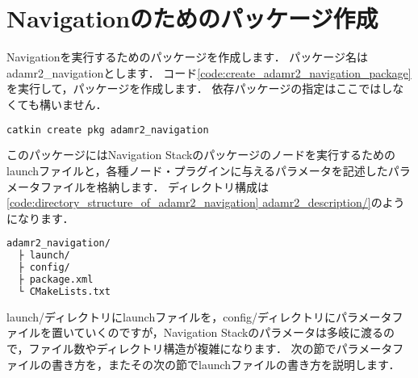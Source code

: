 \documentclass[{../../master}]{subfiles}
\begin{document}
\section{Navigationのためのパッケージ作成}

Navigationを実行するためのパッケージを作成します．
パッケージ名は\textsf{adamr2\_navigation}とします．
コード\ref{code:create_adamr2_navigation_package}を実行して，パッケージを作成します．
依存パッケージの指定はここではしなくても構いません．

\begin{lstlisting}[language=sh, label=code:create_adamr2_navigation_package, caption=Create \textsf{adamr2\_navigation} Package]
catkin create pkg adamr2_navigation
\end{lstlisting}

このパッケージにはNavigation Stackのパッケージのノードを実行するためのlaunchファイルと，各種ノード・プラグインに与えるパラメータを記述したパラメータファイルを格納します．
ディレクトリ構成は\ref{code:directory_structure_of_adamr2_navigation]
adamr2_description/}のようになります．

\begin{lstlisting}[language=sh, caption=Directory Structure of \textsf{adamr2\_navigation}, label=code:directory_structure_of_adamr2_navigation]
adamr2_navigation/
  ├ launch/
  ├ config/
  ├ package.xml
  └ CMakeLists.txt
\end{lstlisting}

\textsf{launch/}ディレクトリにlaunchファイルを，\textsf{config/}ディレクトリにパラメータファイルを置いていくのですが，Navigation Stackのパラメータは多岐に渡るので，ファイル数やディレクトリ構造が複雑になります．
次の節でパラメータファイルの書き方を，またその次の節でlaunchファイルの書き方を説明します．
\end{document}
